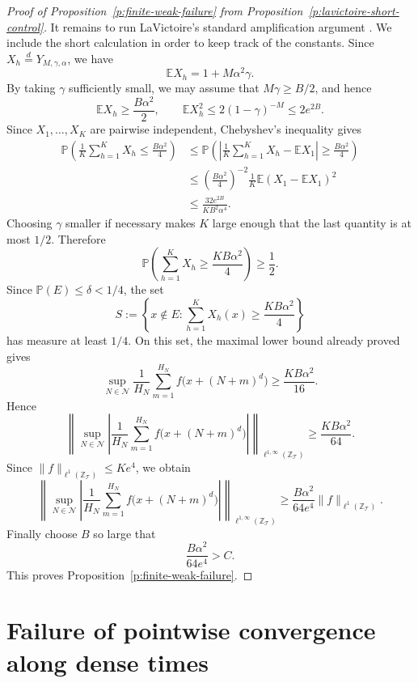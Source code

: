 \documentclass[12pt,leqno]{amsart}
\numberwithin{equation}{section}
\numberwithin{counter2}{section}
\theoremstyle{definition}
\theoremstyle{plain}
\begin{document}
\begin{proof}[Proof of Proposition~\ref{p:finite-weak-failure} from
	Proposition~\ref{p:lavictoire-short-control}]
It remains to run LaVictoire's standard amplification argument
\cite[proof of Proposition~4.1]{L9}. We include the short calculation in order
to keep track of the constants. Since
\(X_h\stackrel{d}{=}Y_{M,\gamma,\alpha}\), we have
\[
\mathbb E X_h=1+M\alpha^2\gamma.
\]
By taking \(\gamma\) sufficiently small, we may assume that
\(M\gamma\geq B/2\), and hence
\[
\mathbb E X_h\geq \frac{B\alpha^2}{2}, \qquad \mathbb E X_h^2
\leq
2(1-\gamma)^{-M}
\leq
2e^{2B}.
\]
Since \(X_1,\dots,X_K\) are pairwise independent, Chebyshev's inequality gives
\[
\begin{aligned}
\mathbb P\left(
\frac1K\sum_{h=1}^K X_h
\leq
\frac{B\alpha^2}{4}
\right)
&\leq
\mathbb P\left(
\left|
\frac1K\sum_{h=1}^K X_h-\mathbb E X_1
\right|
\geq
\frac{B\alpha^2}{4}
\right)  \\
&\leq
\left(\frac{B\alpha^2}{4}\right)^{-2}
\frac1K\mathbb E (X_1-\mathbb E X_1)^2 \\
&\leq
\frac{32e^{2B}}{KB^2\alpha^4}.
\end{aligned}
\]
Choosing \(\gamma\) smaller if necessary makes \(K\) large enough that the last
quantity is at most \(1/2\). Therefore
\[
\mathbb P\left(
\sum_{h=1}^K X_h
\geq
\frac{KB\alpha^2}{4}
\right)
\geq
\frac12.
\]
Since \(\mathbb P(E)\leq\delta<1/4\), the set
\[
S:=
\left\{
x\notin E:
\sum_{h=1}^K X_h(x)
\geq
\frac{KB\alpha^2}{4}
\right\}
\]
has measure at least \(1/4\). On this set, the maximal lower bound already
proved gives
\[
\sup_{N\in\mathcal N}
\frac1{H_N}
\sum_{m=1}^{H_N}
f\bigl(x+(N+m)^d\bigr)
\geq
\frac{KB\alpha^2}{16}.
\]
Hence
\[
\left\|
\sup_{N\in\mathcal N}
\left|
\frac1{H_N}
\sum_{m=1}^{H_N}
f\bigl(x+(N+m)^d\bigr)
\right|
\right\|_{\ell^{1,\infty}(\mathbb Z_{\mathcal T})}
\geq
\frac{KB\alpha^2}{64}.
\]
Since \(\|f\|_{\ell^1(\mathbb Z_{\mathcal T})}\leq Ke^4\), we obtain
\[
\left\|
\sup_{N\in\mathcal N}
\left|
\frac1{H_N}
\sum_{m=1}^{H_N}
f\bigl(x+(N+m)^d\bigr)
\right|
\right\|_{\ell^{1,\infty}(\mathbb Z_{\mathcal T})}
\geq
\frac{B\alpha^2}{64e^4}
\|f\|_{\ell^1(\mathbb Z_{\mathcal T})}.
\]
Finally choose \(B\) so large that
\[
\frac{B\alpha^2}{64e^4}>C.
\]
This proves Proposition~\ref{p:finite-weak-failure}.
\end{proof}


    
	\section{Failure of pointwise convergence along dense times}
	
\end{document}
